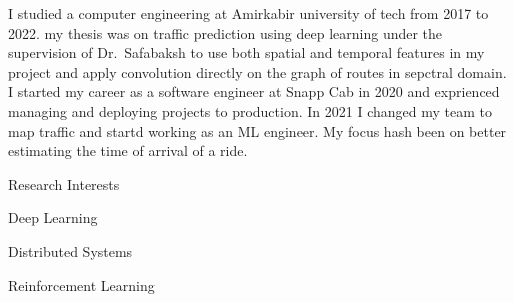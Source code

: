 

\begin{cvparagraph}
I studied a computer engineering at Amirkabir university of tech from 2017 to 2022.
my thesis was on traffic prediction using deep learning under the supervision of
Dr.~Safabaksh to use both spatial and temporal features in my project and apply
convolution directly on the graph of routes in sepctral domain.
I started my career as a software engineer at Snapp Cab in 2020
and exprienced managing and deploying projects to production.
In 2021 I changed my team to map traffic and startd working as an ML engineer.
My focus hash been on better estimating the time of arrival of a ride.

\vspace{5mm}

  \cventry
    {}
    {Research Interests}
    {}
    {}
    {
      \begin{cvitems}
        \item {Deep Learning}
        \item {Distributed Systems}
        \item {Reinforcement Learning}
      \end{cvitems}
    }

\end{cvparagraph}
